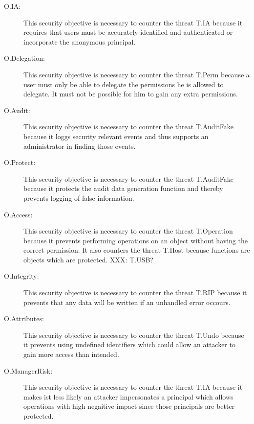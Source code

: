 \documentclass[10pt,a4paper,english]{scrbook}
\begin{document}
\begin{description}
  
  \item[O.IA:] This security objective is necessary to counter the threat T.IA
  because it requires that users must be accurately identified and
  authenticated or incorporate the anonymous principal.


  \item[O.Delegation:] This security objective is necessary to counter the
  threat T.Perm because a user must only be able to delegate the permissions
  he is allowed to delegate. It must not be possible for him to gain any extra
  permissions.
  
  \item[O.Audit:] This security objective is necessary to counter the threat
  T.AuditFake because it loggs security relevant events and thus supports an
  administrator in finding those events.

  \item[O.Protect:] This security objective is necessary to counter the threat
  T.AuditFake because it protects the audit data generation function and
  thereby prevents logging of false information.
  
  \item[O.Access:] This security objective is necessary to counter the threat
  T.Operation because it prevents performing operations on an object without
  having the correct permission. It also counters the threat T.Host because
  functions are objects which are protected.  XXX: T.USB?

  \item[O.Integrity:] This security objective is necessary to counter the
  threat T.RIP because it prevents that any data will be written if an 
  unhandled error occours.
  
  \item[O.Attributes:] This security objective is necessary to counter the
  threat T.Undo because it prevents using undefined identifiers which could
  allow an attacker to gain more access than intended.

  \item[O.ManagerRisk:] This security objective is necessary to counter the
  threat T.IA because it makes ist less likely an attacker impersonates a
  principal which allows operations with high negaitive impact since those
  principals are better protected.
    
  
\end{description}
\end{document}
